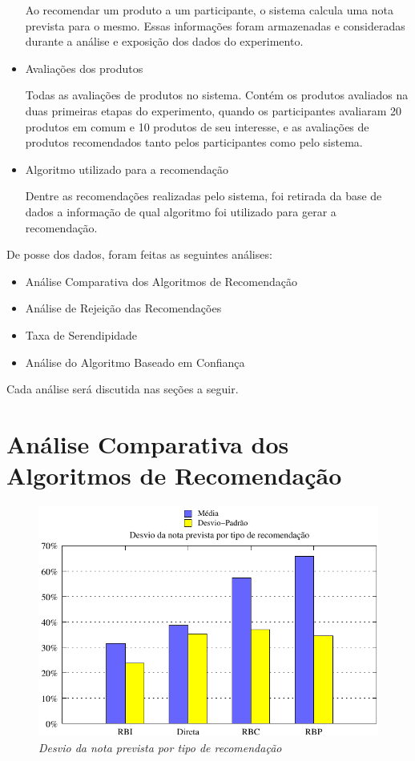 \begin{itemize}
	\subitem Ao recomendar um produto a um participante, o sistema calcula uma nota prevista para o mesmo. Essas informações foram armazenadas e consideradas durante a análise e exposição dos dados do experimento.
	
	\item Avaliações dos produtos
	
	\subitem Todas as avaliações de produtos no sistema. Contém os produtos avaliados na duas primeiras etapas do experimento, quando os participantes avaliaram 20 produtos em comum e 10 produtos de seu interesse, e as avaliações de produtos recomendados tanto pelos participantes como pelo sistema.
	
	\item Algoritmo utilizado para a recomendação
	
	\subitem Dentre as recomendações realizadas pelo sistema, foi retirada da base de dados a informação de qual algoritmo foi utilizado para gerar a recomendação.
	
\end{itemize}

 De posse dos dados, foram feitas as seguintes análises:
 
\begin{itemize}
	\item Análise Comparativa dos Algoritmos de Recomendação
	\item Análise de Rejeição das Recomendações
	\item Taxa de Serendipidade
	\item Análise do Algoritmo Baseado em Confiança
\end{itemize}

 Cada análise será discutida nas seções a seguir.
 
\section{Análise Comparativa dos Algoritmos de Recomendação}
\label{sec:analise_comparativa_dos_algoritmos_de_recomendacao}



\begin{figure}
    \centering
    \includegraphics[width=\textwidth]{imagens/grafico_erro}
    \caption{\it Desvio da nota prevista por tipo de recomendação}
    \label{fig:erro}
\end{figure}

